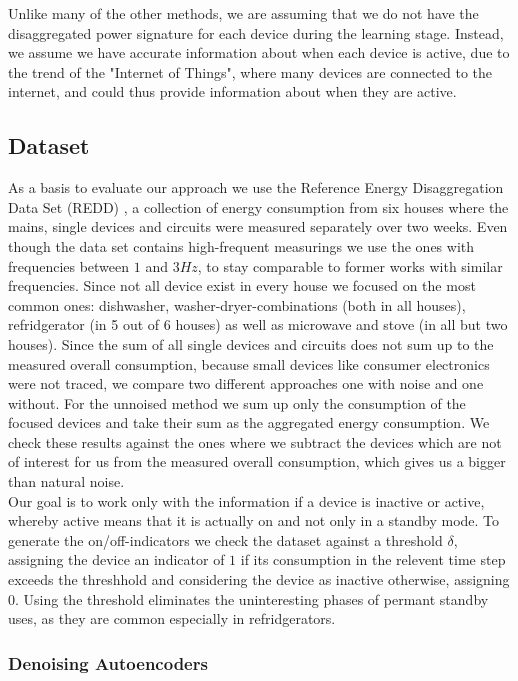 \documentclass{article}
\begin{document}
Unlike many of the other methods, we are assuming that we do not have the disaggregated power signature for each device during the learning stage.
Instead, we assume we have accurate information about when each device is active, due to the trend of the "Internet of Things", where many devices are connected to the internet, and could thus provide information about when they are active.


\subsection{Dataset}
As a basis to evaluate our approach we use the Reference Energy Disaggregation Data Set (REDD) \cite{Redd}, a collection of energy consumption 
from six houses where the mains, single devices and circuits were measured separately over two weeks. Even though the data set contains high-frequent 
measurings we use the ones with frequencies between $1$ and $3 Hz$, to stay comparable to former works with similar frequencies. Since not all 
device exist in every house we focused on the most common ones: dishwasher, washer-dryer-combinations (both in all houses), refridgerator (in 5 
out of 6 houses) as well as microwave and stove (in all but two houses). Since the sum of all single devices and circuits does not sum up to the 
measured overall consumption, because small devices like consumer electronics were not traced, we compare two different approaches one with noise 
and one without. For the unnoised method we sum up only the consumption of the focused devices and take their sum as the aggregated energy consumption. 
We check these results against the ones where we subtract the devices which are not of interest for us from the measured overall consumption, which 
gives us a bigger than natural noise.\\
Our goal is to work only with the information if a device is inactive or active, whereby active means that it is actually on and not only in a
standby mode. To generate the  on/off-indicators we check the dataset against a threshold $\delta$, assigning the device an indicator of $1$ if its 
consumption in the relevent time step exceeds the threshhold and considering the device as inactive otherwise, assigning $0$. Using the threshold 
eliminates the uninteresting phases of permant standby uses, as they are common especially in refridgerators.

\subsubsection{Denoising Autoencoders}
\end{document}
